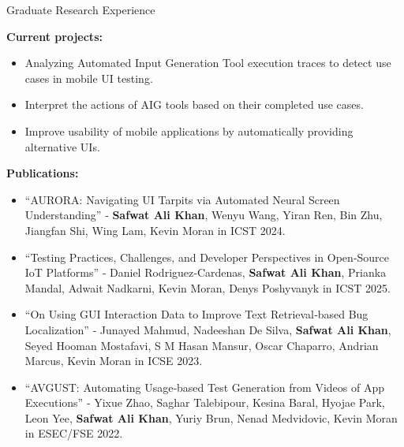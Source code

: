 \documentclass{resume} %
\begin{document}
\begin{rSection}{Graduate Research Experience}
\item{\bf Current projects:}
\begin{itemize}
\item Analyzing Automated Input Generation Tool execution traces to detect use cases in mobile UI testing.
\item Interpret the actions of AIG tools based on their completed use cases.
\item Improve usability of mobile applications by automatically providing alternative UIs.
\end{itemize}

\item {\bf Publications:}
    \begin{itemize}
        \item ``AURORA: Navigating UI Tarpits via Automated Neural Screen Understanding'' ‑ \textbf{Safwat Ali Khan}, Wenyu Wang, Yiran Ren, Bin Zhu, Jiangfan Shi, Wing Lam, Kevin Moran in ICST 2024.
        \item ``Testing Practices, Challenges, and Developer Perspectives in Open‑Source IoT Platforms'' ‑ Daniel Rodriguez‑Cardenas, \textbf{Safwat Ali Khan}, Prianka Mandal, Adwait Nadkarni, Kevin Moran, Denys Poshyvanyk in ICST 2025.
        \item ``On Using GUI Interaction Data to Improve Text Retrieval‑based Bug Localization'' ‑ Junayed Mahmud, Nadeeshan De Silva, \textbf{Safwat Ali Khan}, Seyed Hooman Mostafavi, S M Hasan Mansur, Oscar Chaparro, Andrian Marcus, Kevin Moran in ICSE 2023.
        \item ``AVGUST: Automating Usage‑based Test Generation from Videos of App Executions'' ‑ Yixue Zhao, Saghar Talebipour, Kesina Baral, Hyojae Park, Leon Yee, \textbf{Safwat Ali Khan}, Yuriy Brun, Nenad Medvidovic, Kevin Moran in ESEC/FSE 2022.
    \end{itemize}
\end{rSection}
\end{document}
